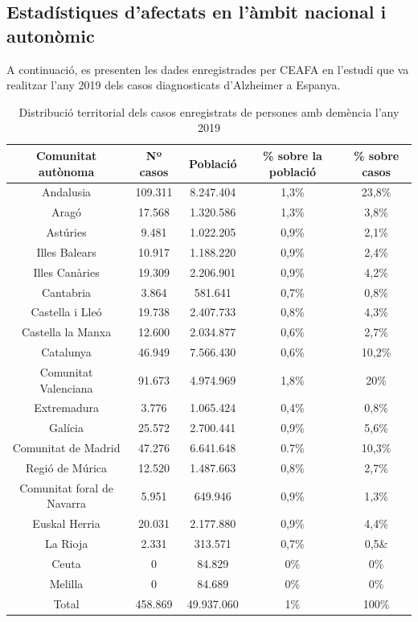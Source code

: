 \documentclass[a4paper,12pt]{article}
\begin{document}
\subsection*{Estadístiques d'afectats en l'àmbit nacional i autonòmic}
A continuació, es presenten les dades enregistrades per CEAFA en l'estudi que va realitzar l'any 2019 dels casos diagnosticats d'Alzheimer a Espanya.
\begin{table}[h]
    \centering
    \begin{tabular}{ |c | c | c | c | c| } 
        \hline
        \hline Comunitat autònoma & Nº casos & Població & \% sobre la població & \% sobre casos\\
        \hline
         Andalusia & 109.311 & 8.247.404 & 1,3\% & 23,8\% \\
         \hline
         Aragó & 17.568 & 1.320.586 & 1,3\% & 3,8\% \\
         \hline
         Astúries & 9.481 & 1.022.205 & 0,9\% & 2,1\% \\
         \hline
         Illes Balears & 10.917 & 1.188.220 & 0,9\% & 2,4\% \\
          \hline
         Illes Canàries & 19.309 & 2.206.901 & 0,9\% & 4,2\% \\
          \hline
         Cantabria & 3.864 & 581.641 & 0,7\% & 0,8\% \\
          \hline
         Castella i Lleó & 19.738 & 2.407.733 & 0,8\% & 4,3\% \\
          \hline
         Castella la Manxa & 12.600 & 2.034.877 & 0,6\% & 2,7\% \\
          \hline
         Catalunya & 46.949 & 7.566.430 & 0,6\% & 10,2\% \\
          \hline
         Comunitat Valenciana & 91.673 & 4.974.969 & 1,8\% & 20\% \\ 
          \hline
         Extremadura & 3.776 & 1.065.424 & 0,4\% & 0,8\% \\
          \hline
         Galícia & 25.572 & 2.700.441 & 0,9\% & 5,6\% \\ 
          \hline
         Comunitat de Madrid & 47.276 & 6.641.648 & 0.7\% & 10,3\% \\ 
         \hline
         Regió de Múrica & 12.520 & 1.487.663 & 0,8\% & 2,7\% \\
          \hline
         Comunitat foral de Navarra & 5.951 & 649.946 & 0,9\% & 1,3\% \\ 
          \hline
         Euskal Herria & 20.031 & 2.177.880 & 0,9\% & 4,4\% \\ 
          \hline
         La Rioja & 2.331 & 313.571 & 0,7\% & 0,5\& \\ 
          \hline
         Ceuta & 0 & 84.829 & 0\%  & 0\% \\ 
          \hline
         Melilla & 0 & 84.689 & 0\%  & 0\% \\
          \hline
        Total & 458.869 & 49.937.060 & 1\% & 100\% \\
          \hline
    \end{tabular}
    \caption{Distribució territorial dels casos enregistrats de persones amb demència l'any 2019}
    \label{tab:taula1}
\end{table}
\end{document}
